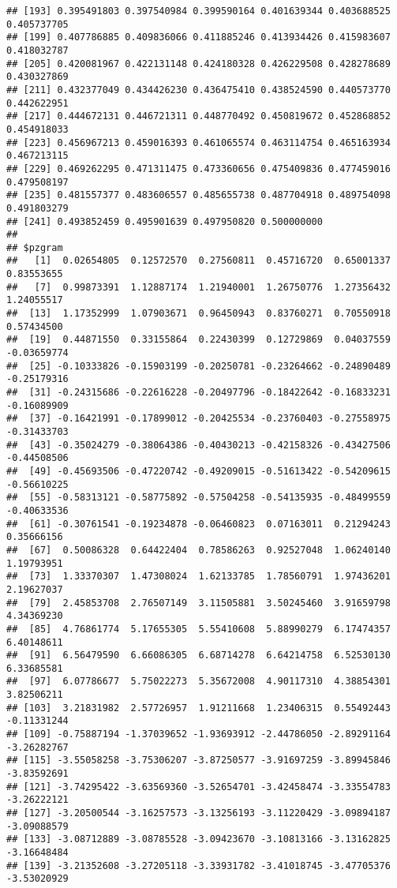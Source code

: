 \documentclass[
]{article}
\begin{document}
\begin{verbatim}
## [193] 0.395491803 0.397540984 0.399590164 0.401639344 0.403688525 0.405737705
## [199] 0.407786885 0.409836066 0.411885246 0.413934426 0.415983607 0.418032787
## [205] 0.420081967 0.422131148 0.424180328 0.426229508 0.428278689 0.430327869
## [211] 0.432377049 0.434426230 0.436475410 0.438524590 0.440573770 0.442622951
## [217] 0.444672131 0.446721311 0.448770492 0.450819672 0.452868852 0.454918033
## [223] 0.456967213 0.459016393 0.461065574 0.463114754 0.465163934 0.467213115
## [229] 0.469262295 0.471311475 0.473360656 0.475409836 0.477459016 0.479508197
## [235] 0.481557377 0.483606557 0.485655738 0.487704918 0.489754098 0.491803279
## [241] 0.493852459 0.495901639 0.497950820 0.500000000
## 
## $pzgram
##   [1]  0.02654805  0.12572570  0.27560811  0.45716720  0.65001337  0.83553655
##   [7]  0.99873391  1.12887174  1.21940001  1.26750776  1.27356432  1.24055517
##  [13]  1.17352999  1.07903671  0.96450943  0.83760271  0.70550918  0.57434500
##  [19]  0.44871550  0.33155864  0.22430399  0.12729869  0.04037559 -0.03659774
##  [25] -0.10333826 -0.15903199 -0.20250781 -0.23264662 -0.24890489 -0.25179316
##  [31] -0.24315686 -0.22616228 -0.20497796 -0.18422642 -0.16833231 -0.16089909
##  [37] -0.16421991 -0.17899012 -0.20425534 -0.23760403 -0.27558975 -0.31433703
##  [43] -0.35024279 -0.38064386 -0.40430213 -0.42158326 -0.43427506 -0.44508506
##  [49] -0.45693506 -0.47220742 -0.49209015 -0.51613422 -0.54209615 -0.56610225
##  [55] -0.58313121 -0.58775892 -0.57504258 -0.54135935 -0.48499559 -0.40633536
##  [61] -0.30761541 -0.19234878 -0.06460823  0.07163011  0.21294243  0.35666156
##  [67]  0.50086328  0.64422404  0.78586263  0.92527048  1.06240140  1.19793951
##  [73]  1.33370307  1.47308024  1.62133785  1.78560791  1.97436201  2.19627037
##  [79]  2.45853708  2.76507149  3.11505881  3.50245460  3.91659798  4.34369230
##  [85]  4.76861774  5.17655305  5.55410608  5.88990279  6.17474357  6.40148611
##  [91]  6.56479590  6.66086305  6.68714278  6.64214758  6.52530130  6.33685581
##  [97]  6.07786677  5.75022273  5.35672008  4.90117310  4.38854301  3.82506211
## [103]  3.21831982  2.57726957  1.91211668  1.23406315  0.55492443 -0.11331244
## [109] -0.75887194 -1.37039652 -1.93693912 -2.44786050 -2.89291164 -3.26282767
## [115] -3.55058258 -3.75306207 -3.87250577 -3.91697259 -3.89945846 -3.83592691
## [121] -3.74295422 -3.63569360 -3.52654701 -3.42458474 -3.33554783 -3.26222121
## [127] -3.20500544 -3.16257573 -3.13256193 -3.11220429 -3.09894187 -3.09088579
## [133] -3.08712889 -3.08785528 -3.09423670 -3.10813166 -3.13162825 -3.16648484
## [139] -3.21352608 -3.27205118 -3.33931782 -3.41018745 -3.47705376 -3.53020929

\end{verbatim}
\end{document}
